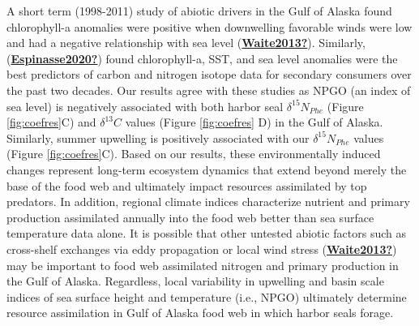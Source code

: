 \documentclass [11pt, proquest] {uwthesis}[2015/03/03]
\begin{document}
A short term (1998-2011) study of abiotic drivers in the Gulf of Alaska found chlorophyll-a anomalies were positive when downwelling favorable winds were low and had a negative relationship with sea level (\protect\hyperlink{ref-Waite2013}{\textbf{Waite2013?}}). Similarly, (\protect\hyperlink{ref-Espinasse2020}{\textbf{Espinasse2020?}}) found chlorophyll-a, SST, and sea level anomalies were the best predictors of carbon and nitrogen isotope data for secondary consumers over the past two decades. Our results agree with these studies as NPGO (an index of sea level) is negatively associated with both harbor seal \(\delta^{15}N_{Phe}\) (Figure \ref{fig:coefres}C) and \(\delta^{13}C\) values (Figure \ref{fig:coefres} D) in the Gulf of Alaska. Similarly, summer upwelling is positively associated with our \(\delta^{15}N_{Phe}\) values (Figure \ref{fig:coefres}C). Based on our results, these environmentally induced changes represent long-term ecosystem dynamics that extend beyond merely the base of the food web and ultimately impact resources assimilated by top predators. In addition, regional climate indices characterize nutrient and primary production assimilated annually into the food web better than sea surface temperature data alone. It is possible that other untested abiotic factors such as cross-shelf exchanges via eddy propagation or local wind stress (\protect\hyperlink{ref-Waite2013}{\textbf{Waite2013?}}) may be important to food web assimilated nitrogen and primary production in the Gulf of Alaska. Regardless, local variability in upwelling and basin scale indices of sea surface height and temperature (i.e., NPGO) ultimately determine resource assimilation in Gulf of Alaska food web in which harbor seals forage.
\end{document}
